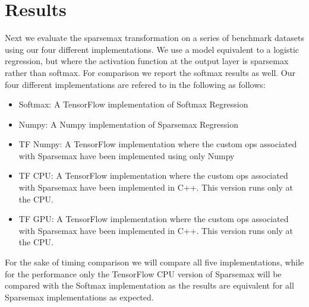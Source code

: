 \section{Results}
Next we evaluate the sparsemax transformation on a series of benchmark datasets using our four different implementations. We use a  model equivalent to a logistic regression, but where the activation function at the output layer is sparsemax rather than softmax. For comparison we report the softmax results as well. Our four different implementations are refered to in the following as follows:
\begin{itemize}
\item Softmax: A TensorFlow implementation of Softmax Regression
\item Numpy: A Numpy implementation of Sparsemax Regression
\item TF Numpy: A TensorFlow implementation where the custom ops associated with Sparsemax have been implemented using only Numpy
\item TF CPU: A TensorFlow implementation where the custom ops associated with Sparsemax have been implemented in C++. This version runs only at the CPU.
\item TF GPU: A TensorFlow implementation where the custom ops associated with Sparsemax have been implemented in C++. This version runs only at the CPU.
\end{itemize}
For the sake of timing comparison we will compare all five implementations, while for the performance only the TensorFlow CPU version of Sparsemax will be compared with the Softmax implementation as the results are equivalent for all Sparsemax implementations as expected.
